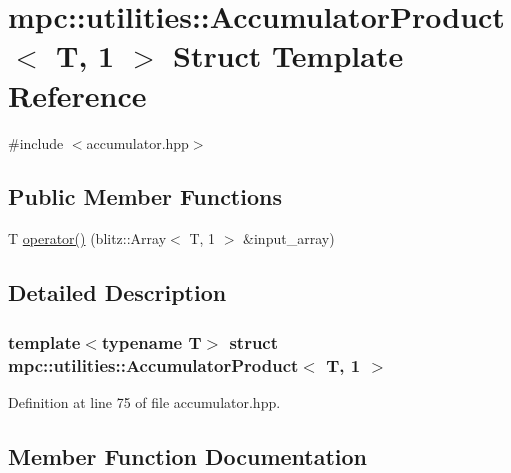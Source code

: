 \hypertarget{structmpc_1_1utilities_1_1_accumulator_product_3_01_t_00_011_01_4}{}\section{mpc\+:\+:utilities\+:\+:Accumulator\+Product$<$ T, 1 $>$ Struct Template Reference}
\label{structmpc_1_1utilities_1_1_accumulator_product_3_01_t_00_011_01_4}


{\ttfamily \#include $<$accumulator.\+hpp$>$}

\subsection*{Public Member Functions}
\begin{DoxyCompactItemize}
\item 
T \mbox{\hyperlink{structmpc_1_1utilities_1_1_accumulator_product_3_01_t_00_011_01_4_a3facff3fdd5b800a83dd5baa9cc89192}{operator()}} (blitz\+::\+Array$<$ T, 1 $>$ \&input\+\_\+array)
\end{DoxyCompactItemize}


\subsection{Detailed Description}
\subsubsection*{template$<$typename T$>$\newline
struct mpc\+::utilities\+::\+Accumulator\+Product$<$ T, 1 $>$}



Definition at line 75 of file accumulator.\+hpp.



\subsection{Member Function Documentation}
\mbox{\label{structmpc_1_1utilities_1_1_accumulator_product_3_01_t_00_011_01_4_a3facff3fdd5b800a83dd5baa9cc89192}} 
